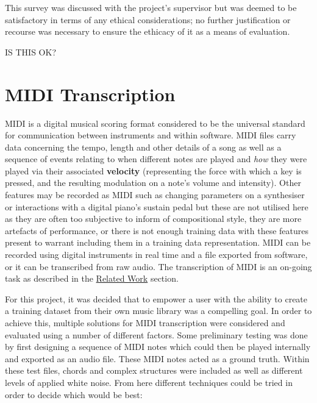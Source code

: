 \documentclass[12pt,]{article}
\begin{document}
This survey was discussed with the project's supervisor but was deemed
to be satisfactory in terms of any ethical considerations; no further
justification or recourse was necessary to ensure the ethicacy of it as
a means of evaluation.

IS THIS OK?

\hypertarget{midi-transcription}{%
\section{MIDI Transcription}\label{midi-transcription}}

MIDI is a digital musical scoring format considered to be the universal
standard for communication between instruments and within software. MIDI
files carry data concerning the tempo, length and other details of a
song as well as a sequence of events relating to when different notes
are played and \emph{how} they were played via their associated
\textbf{velocity} (representing the force with which a key is pressed,
and the resulting modulation on a note's volume and intensity). Other
features may be recorded as MIDI such as changing parameters on a
synthesiser or interactions with a digital piano's sustain pedal but
these are not utilised here as they are often too subjective to inform
of compositional style, they are more artefacts of performance, or there
is not enough training data with these features present to warrant
including them in a training data representation. MIDI can be recorded
using digital instruments in real time and a file exported from
software, or it can be transcribed from raw audio. The transcription of
MIDI is an on-going task as described in the
\protect\hyperlink{relatedwork}{Related Work} section.

For this project, it was decided that to empower a user with the ability
to create a training dataset from their own music library was a
compelling goal. In order to achieve this, multiple solutions for MIDI
transcription were considered and evaluated using a number of different
factors. Some preliminary testing was done by first designing a sequence
of MIDI notes which could then be played internally and exported as an
audio file. These MIDI notes acted as a ground truth. Within these test
files, chords and complex structures were included as well as different
levels of applied white noise. From here different techniques could be
tried in order to decide which would be best:
\end{document}
